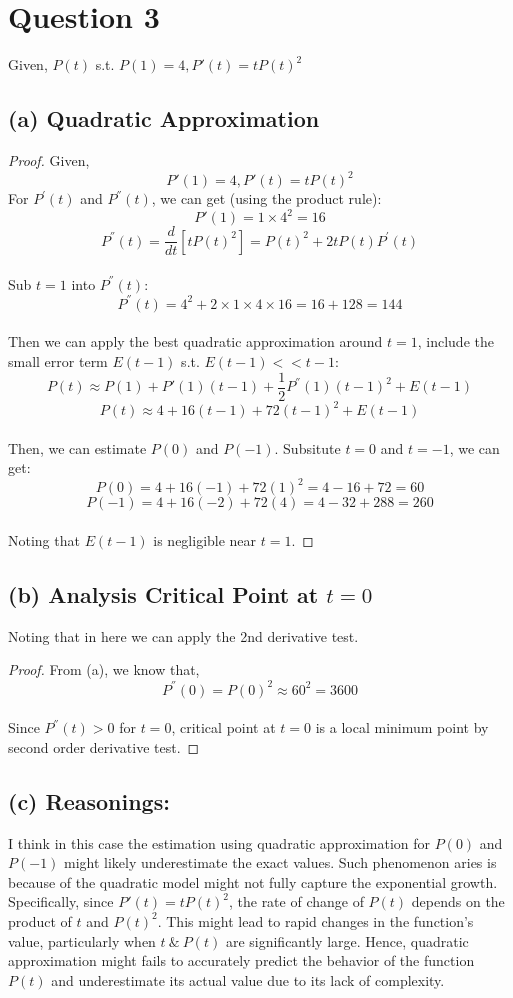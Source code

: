 \documentclass{article}
\begin{document}
\section*{Question 3}
Given, $P(t)$ s.t. $P(1) = 4, P'(t) = tP(t)^2$

\subsection*{(a) Quadratic Approximation}
\begin{proof}
    Given,
    \[ P'(1) = 4, P'(t) = tP(t)^2 \]
    For $P^{'}(t)$ and $P^{''}(t)$, we can get (using the product rule):
    \\
    \[ P'(1) = 1 \times 4^2 = 16 \]
    \[ P^{''}(t) = \frac{d}{dt}[tP(t)^2] = P(t)^2 + 2tP(t)P^{'}(t)\]
    \\
    Sub $t = 1$ into $P^{''}(t)$:
    \[ P^{''}(t) = 4^2 + 2 \times 1 \times 4 \times 16 = 16 + 128 = 144 \]
    \\
    Then we can apply the best quadratic approximation around $t = 1$, include the small error term $E(t-1)$ s.t. $E(t-1) << t-1$:
    \[ P(t) \approx P(1) + P'(1)(t - 1) + \frac{1}{2}P^{''}(1)(t - 1)^2 + E(t - 1) \]
    \[ P(t) \approx 4 + 16(t - 1) + 72(t - 1)^2 + E(t - 1) \]
    \\
    Then, we can estimate $P(0)$ and $P(-1)$. Subsitute $t = 0$ and $t = -1$, we can get:
    \[ P(0) = 4 + 16(-1) + 72(1)^2 = 4 - 16 + 72 = 60 \]
    \[ P(-1) = 4 + 16(-2) + 72(4) = 4 - 32 + 288 = 260 \]
    \\
    Noting that $E(t - 1)$ is negligible near $t = 1$.
\end{proof}

\subsection*{(b) Analysis Critical Point at $t = 0$}
Noting that in here we can apply the 2nd derivative test.
\begin{proof}
    From (a), we know that,
    \[ P^{''}(0) = P(0)^2 \approx 60^2 = 3600 \]
    \\
    Since $P^{''}(t) > 0$ for $t = 0$, critical point at $t = 0$ is a local minimum point by second order derivative test.
\end{proof}

\subsection*{(c) Reasonings: }
I think in this case the estimation using quadratic approximation for $P(0)$ and $P(-1)$ might likely underestimate the exact values. Such phenomenon aries is 
because of the quadratic model might not fully capture the exponential growth.
Specifically, since $P'(t) = tP(t)^2$, the rate of change of $P(t)$ depends on the product of $t$ and $P(t)^2$. This might lead to rapid changes in the function's value, 
particularly when $t \ \& \ P(t)$ are significantly large.
Hence, quadratic approximation might fails to accurately predict the behavior of the function $P(t)$ and underestimate its actual value due to its lack of complexity.
\end{document}
